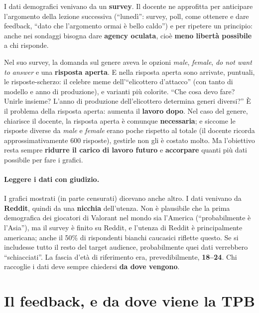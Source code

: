 I dati demografici venivano da un \textbf{survey}. Il docente ne approfitta
per anticipare l'argomento della lezione successiva (``lunedì'': survey,
poll, come ottenere e dare feedback, ``dato che l'argomento ormai è bello
caldo'') e per ripetere un principio: anche nei sondaggi bisogna dare
\textbf{agency oculata}, cioè \textbf{meno libertà possibile} a chi risponde.

Nel suo survey, la domanda sul genere aveva le opzioni \emph{male},
\emph{female}, \emph{do not want to answer} e una \textbf{risposta aperta}.
E nella risposta aperta sono arrivate, puntuali, le risposte-scherzo: il
celebre meme dell'``elicottero d'attacco'' (con tanto di modello e anno di
produzione), e varianti più colorite. ``Che cosa devo fare? Unirle insieme?
L'anno di produzione dell'elicottero determina generi diversi?'' È il
problema della risposta aperta: aumenta il \textbf{lavoro dopo}. Nel caso del
genere, chiarisce il docente, la risposta aperta è comunque
\textbf{necessaria}; e siccome le risposte diverse da \emph{male} e
\emph{female} erano poche rispetto al totale (il docente ricorda
approssimativamente 600 risposte), gestirle non gli è costato molto. Ma
l'obiettivo resta sempre \textbf{ridurre il carico di lavoro futuro} e
\textbf{accorpare} quanti più dati possibile per fare i grafici.

\paragraph{Leggere i dati con giudizio.} I grafici mostrati (in parte
censurati) dicevano anche altro. I dati venivano da \textbf{Reddit}, quindi da
una \textbf{nicchia} dell'utenza. Non è plausibile che la prima demografica
dei giocatori di Valorant nel mondo sia l'America (``probabilmente è
l'Asia''), ma il survey è finito su Reddit, e l'utenza di Reddit è
principalmente americana; anche il 50\% di rispondenti bianchi caucasici
riflette questo. Se si includesse tutto il resto del target audience,
probabilmente quei dati verrebbero ``schiacciati''. La fascia d'età di
riferimento era, prevedibilmente, \textbf{18--24}. Chi raccoglie i dati deve
sempre chiedersi \textbf{da dove vengono}.

\section{Il feedback, e da dove viene la TPB}
\label{gd9:sec:feedback-sa}

